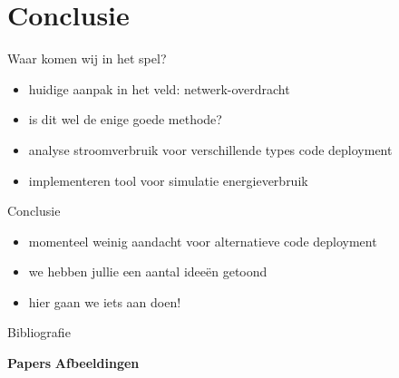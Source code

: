 \documentclass[presentation, bigger]{beamer}
\begin{document}
\section{Conclusie}
\label{sec-4}
\begin{frame}[label=sec-4-1]{Waar komen wij in het spel?}
  \begin{itemize}
  \item huidige aanpak in het veld: netwerk-overdracht
  \item is dit wel de enige goede methode?
  \item analyse stroomverbruik voor verschillende types code deployment
  \item implementeren tool voor simulatie energieverbruik
  \end{itemize}
\end{frame}

\begin{frame}[label=sec-4-2]{Conclusie}
  \begin{itemize}
  \item momenteel weinig aandacht voor alternatieve code deployment
  \item we hebben jullie een aantal idee\"en getoond 
  \item hier gaan we iets aan doen!
  \end{itemize}
\end{frame}
\begin{frame}[allowframebreaks]{Bibliografie}

  \nocite{*}
  \textbf{Papers}
  \printbibliography[category=papers]
  \newpage
  \textbf{Afbeeldingen}
  \printbibliography[type=misc]
\end{frame}
\end{document}
